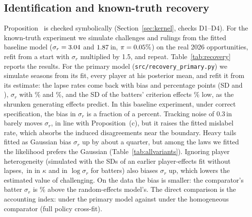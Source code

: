 \documentclass[aoas]{imsart}
\theoremstyle{plain}
\theoremstyle{definition}
\begin{document}
\subsection{Identification and known-truth recovery}
Proposition~ is checked symbolically (Section~\ref{sec:kernel}, checks D1--D4). For the known-truth
experiment we simulate challenges and rulings from the fitted baseline model ($\sigma_r=3.04$ and
$1.87$\,in, $\pi=0.05\%$) on the real 2026 opportunities, refit from a start with $\sigma_r$
multiplied by 1.5, and repeat. Table~\ref{tab:recovery} reports the results. For the primary model
(\texttt{src/recovery\_primary.py}) we simulate \RecPN{} seasons from its fit, every player at his posterior mean, and
refit it from its estimate: the lapse rates come back with bias \RecPLapseBatter{} and \RecPLapseCatcher{} percentage
points (SD \RecPLapseSDBatter{} and \RecPLapseSDCatcher), $\sigma_r$ with \RecPSrBatter\% and \RecPSrCatcher\%, and the
SD of the batters' criterion effects \RecPSdKBatter\% low, as the shrunken generating effects predict. In this baseline experiment, under correct specification, the bias in $\sigma_r$ is a fraction of a percent. Tracking noise of 0.3\,in barely moves $\sigma_r$, in line with
Proposition~(c), but it raises the fitted mislabel rate, which absorbs the induced disagreements near
the boundary. Heavy tails fitted as Gaussian bias $\sigma_r$ up by about a quarter, but among the laws we fitted the likelihood
prefers the Gaussian (Table~\ref{tab:allvariants}). Ignoring player heterogeneity (simulated with the SDs of an earlier
player-effects fit without lapses, \SREUsedBatter\,in in $\kappa$ and \SREUsedLogBatter{} in $\log\sigma_r$ for batters) also biases $\sigma_r$ up, which lowers the estimated value of
challenging. On the data the bias is smaller: the comparator's batter $\sigma_r$ is \HetDataBiasBatter\% above the
random-effects model's. The direct comparison is the accounting index: \Gap{} under the primary model against
\GapMain{} under the homogeneous comparator (full policy cross-fit).

\begin{table}[!htbp]
\caption{Known-truth recovery of decision noise on the real 2026 opportunities.}\label{tab:recovery}
\centering\small
\resizebox{\textwidth}{!}{}
\end{table}
\end{document}
